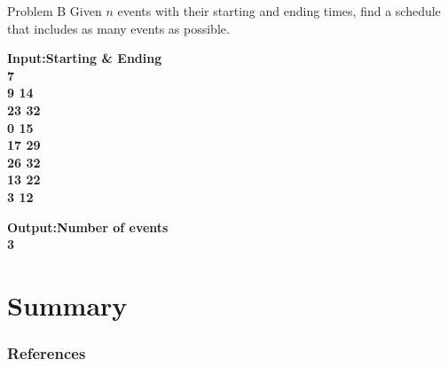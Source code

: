 \documentclass{beamer}
\begin{document}
\begin{frame}{Problem B}
    Given $n$ events with their starting and ending times, find a schedule that includes as many events as possible.
    \begin{multicols}{2}
        \begin{flushleft}
            \bf{Input:}\normalfont Starting \& Ending\\
            7\\
            9 14\\
            23 32\\
            0 15\\
            17 29\\
            26 32\\
            13 22\\
            3 12
        \end{flushleft}
        \vfill\null
        \columnbreak
        \begin{flushleft}
            \bf{Output:}\normalfont Number of events\\
            3
        \end{flushleft}
    \end{multicols}
\end{frame}
\section{Summary}
\begin{frame}
    \frametitle{References}
    
    
\end{frame}
\end{document}

